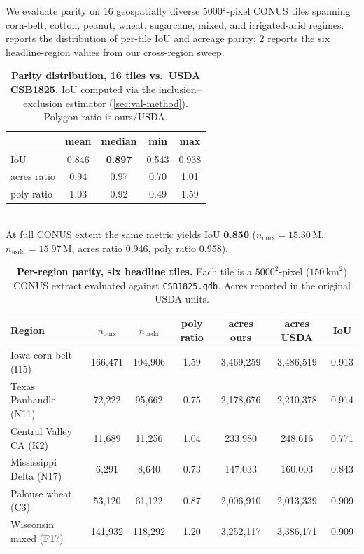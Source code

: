 \documentclass{article}
\begin{document}
We evaluate parity on 16 geospatially diverse $5000^2$-pixel CONUS
tiles spanning corn-belt, cotton, peanut, wheat, sugarcane, mixed,
and irrigated-arid regimes.  reports the
distribution of per-tile IoU and acreage parity;
\cref{tab:parity-detail} reports the six headline-region values from
our cross-region sweep.

\begin{table}[t]
\centering
\caption{\textbf{Parity distribution, 16 tiles vs.\ USDA CSB1825.}
IoU computed via the inclusion--exclusion estimator
(\cref{sec:val-method}). Polygon ratio is ours/USDA.}
\label{tab:parity-summary}
\small
\begin{tabular}{lcccc}
\toprule
                & mean & median & min & max \\
\midrule
IoU             & 0.846 & \textbf{0.897} & 0.543 & 0.938 \\
acres ratio     & 0.94  & 0.97           & 0.70  & 1.01 \\
poly ratio      & 1.03  & 0.92           & 0.49  & 1.59 \\
\bottomrule
\end{tabular}
\vspace{0.4em}\\
At full CONUS extent the same metric yields IoU \textbf{0.850}
($n_\text{ours}{=}15.30\,\text{M}$, $n_\text{usda}{=}15.97\,\text{M}$,
acres ratio 0.946, poly ratio 0.958).
\end{table}

\begin{table}[t]
\centering
\caption{\textbf{Per-region parity, six headline tiles.} Each tile is a
$5000^2$-pixel ($150\,\text{km}^2$) CONUS extract evaluated against
\texttt{CSB1825.gdb}. Acres reported in the original USDA units.}
\label{tab:parity-detail}
\small
\begin{tabular}{lcccccc}
\toprule
Region & $n_\text{ours}$ & $n_\text{usda}$ & poly ratio & acres ours & acres USDA & IoU \\
\midrule
Iowa corn belt (I15)        & 166{,}471 & 104{,}906 & 1.59 & 3{,}469{,}259 & 3{,}486{,}519 & 0.913 \\
Texas Panhandle (N11)       &  72{,}222 &  95{,}662 & 0.75 & 2{,}178{,}676 & 2{,}210{,}378 & 0.914 \\
Central Valley CA (K2)      &  11{,}689 &  11{,}256 & 1.04 &   233{,}980   &   248{,}616   & 0.771 \\
Mississippi Delta (N17)     &   6{,}291 &   8{,}640 & 0.73 &   147{,}033   &   160{,}003   & 0.843 \\
Palouse wheat (C3)          &  53{,}120 &  61{,}122 & 0.87 & 2{,}006{,}910 & 2{,}013{,}339 & 0.909 \\
Wisconsin mixed (F17)       & 141{,}932 & 118{,}292 & 1.20 & 3{,}252{,}117 & 3{,}386{,}171 & 0.909 \\
\bottomrule
\end{tabular}
\end{table}
\end{document}
